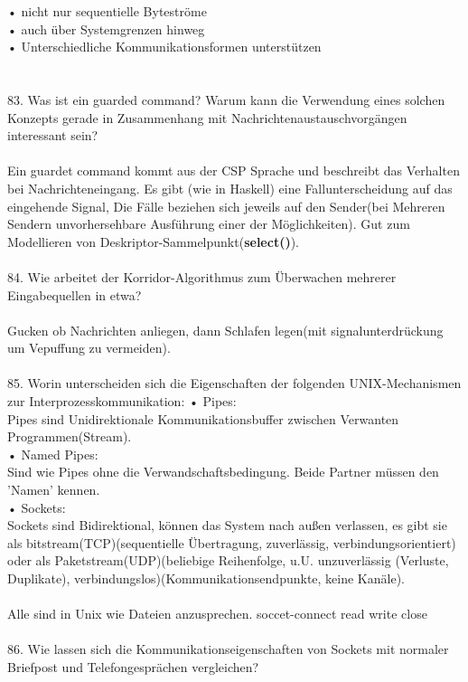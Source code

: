 \documentclass{article}
\begin{document}
• nicht nur sequentielle Byteströme\\
• auch über Systemgrenzen hinweg\\
• Unterschiedliche Kommunikationsformen unterstützen\\
\\
\\
83. Was ist ein guarded command? Warum kann die Verwendung eines solchen Konzepts gerade
in Zusammenhang mit Nachrichtenaustauschvorgängen interessant sein?
\\
\\
Ein guardet command kommt aus der CSP Sprache und beschreibt das Verhalten bei Nachrichteneingang. Es gibt (wie in Haskell) eine Fallunterscheidung auf das eingehende Signal, Die F\"alle beziehen sich jeweils auf den Sender(bei Mehreren Sendern unvorhersehbare Ausf\"uhrung einer der M\"oglichkeiten). Gut zum Modellieren von Deskriptor-Sammelpunkt(\textbf{select()}).
\\
\\
84. Wie arbeitet der Korridor-Algorithmus zum Überwachen mehrerer Eingabequellen in etwa?
\\
\\
Gucken ob Nachrichten anliegen, dann Schlafen legen(mit signalunterdr\"uckung um Vepuffung zu vermeiden).
\\
\\
85. Worin unterscheiden sich die Eigenschaften der folgenden UNIX-Mechanismen zur Interprozesskommunikation:
• Pipes:\\
Pipes sind Unidirektionale Kommunikationsbuffer zwischen Verwanten Programmen(Stream).\\
• Named Pipes:\\
Sind wie Pipes ohne die Verwandschaftsbedingung. Beide Partner m\"ussen den 'Namen' kennen.\\
• Sockets:\\
Sockets sind Bidirektional, k\"onnen das System nach au\ss en verlassen, es gibt sie als bitstream(TCP)(sequentielle Übertragung, zuverlässig, verbindungsorientiert) oder als Paketstream(UDP)(beliebige Reihenfolge, u.U. unzuverlässig (Verluste, Duplikate), verbindungslos)(Kommunikationsendpunkte, keine Kan\"ale).
\\
\\
Alle sind in Unix wie Dateien anzusprechen.
soccet-connect read write close
\\
\\
86. Wie lassen sich die Kommunikationseigenschaften von Sockets mit normaler Briefpost und
Telefongesprächen vergleichen?
\end{document}
